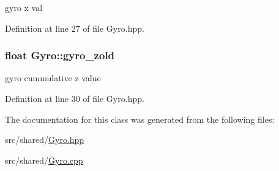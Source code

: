 gyro x val 



Definition at line 27 of file Gyro.\-hpp.

\hypertarget{classGyro_a50fdddd60b9220d2f61645653dd6053d}{
\subsubsection[{gyro\-\_\-zold}]{\setlength{\rightskip}{0pt plus 5cm}float Gyro\-::gyro\-\_\-zold\hspace{0.3cm}{\ttfamily [private]}}}\label{classGyro_a50fdddd60b9220d2f61645653dd6053d}


gyro cummulative z value 



Definition at line 30 of file Gyro.\-hpp.



The documentation for this class was generated from the following files\-:\begin{DoxyCompactItemize}
\item 
src/shared/\hyperlink{Gyro_8hpp}{Gyro.\-hpp}\item 
src/shared/\hyperlink{Gyro_8cpp}{Gyro.\-cpp}\end{DoxyCompactItemize}
